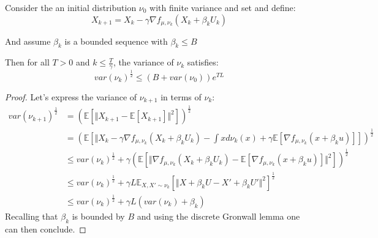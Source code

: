 %
\begin{lemma}\label{lem:Control_variance}
Consider the an initial distribution
$\nu_{0}$ with finite variance and set and define:
\[
X_{k+1}=X_{k}-\gamma\nabla f_{\mu,\nu_{k}}(X_{k}+\beta_{k}U_{k})
\]

And assume $\beta_{k}$ is a bounded sequence with $\beta_{k}\leq B$

Then for all $T>0$ and $k\leq\frac{T}{\gamma}$, the variance of
$\nu_{k}$ satisfies:
\[
var(\nu_{k})^{\frac{1}{2}}\leq(B+var(\nu_{0}))e^{TL}
\]
\end{lemma}
%
\begin{proof}
Let's express the variance of $\nu_{k+1}$ in terms of $\nu_{k}$:
\begin{align*}
var(\nu_{k+1})^{\frac{1}{2}} & =(\mathbb{E}[\Vert X_{k+1}-\mathbb{E}[X_{k+1}]\Vert^{2}])^{\frac{1}{2}}\\
 & =(\mathbb{E}[\Vert X_{k}-\gamma\nabla f_{\mu,\nu_{k}}(X_{k}+\beta_{k}U_{k})-\int xd\nu_{k}(x)+\gamma\mathbb{E}[\nabla f_{\mu,\nu_{k}}(x+\beta_{k}u)]])^{\frac{1}{2}}\\
 & \leq var(\nu_{k})^{\frac{1}{2}}+\gamma(\mathbb{E}[\Vert\nabla f_{\mu,\nu_{k}}(X_{k}+\beta_{k}U_{k})-\mathbb{E}[\nabla f_{\mu,\nu_{k}}(x+\beta_{k}u)]\Vert^{2}])^{\frac{1}{2}}\\
 & \leq var(\nu_{k})^{\frac{1}{2}}+\gamma L\mathbb{E}_{X,X'\sim\nu_{k}}[\Vert X+\beta_{k}U-X'+\beta_{k}U'\Vert^{2}]^{\frac{1}{2}}\\
 & \leq var(\nu_{k})^{\frac{1}{2}}+\gamma L(var(\nu_{k})+\beta_{k})
\end{align*}
Recalling that $\beta_{k}$ is bounded by $B$ and using the discrete
Gronwall lemma one can then conclude. 
\end{proof}


